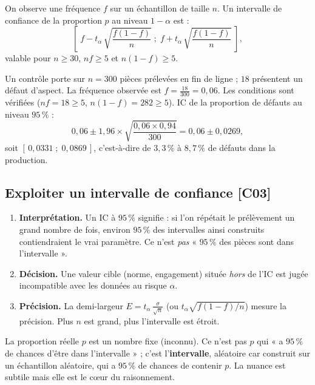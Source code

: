 \documentclass[a4paper,11pt]{article}
\begin{document}
\begin{theoreme}
On observe une fréquence $f$ sur un échantillon de taille $n$. Un intervalle de confiance de la proportion $p$ au niveau $1-\alpha$ est :
\[
\boxed{\left[\;f - t_\alpha\,\sqrt{\frac{f(1-f)}{n}}\;;\;f + t_\alpha\,\sqrt{\frac{f(1-f)}{n}}\;\right],}
\]
valable pour $n \geq 30$, $nf \geq 5$ et $n(1-f) \geq 5$.
\end{theoreme}

\begin{exemple}
Un contrôle porte sur $n = 300$ pièces prélevées en fin de ligne ; $18$ présentent un défaut d'aspect. La fréquence observée est $f = \frac{18}{300} = 0{,}06$. Les conditions sont vérifiées ($nf = 18 \geq 5$, $n(1-f) = 282 \geq 5$). IC de la proportion de défauts au niveau $95\,\%$ :
\[
0{,}06 \pm 1{,}96 \times \sqrt{\frac{0{,}06 \times 0{,}94}{300}} = 0{,}06 \pm 0{,}0269,
\]
soit $[\,0{,}0331\;;\;0{,}0869\,]$, c'est-à-dire de $3{,}3\,\%$ à $8{,}7\,\%$ de défauts dans la production.
\end{exemple}

\subsection{Exploiter un intervalle de confiance \hfill {\normalsize\color{uimmred}[C03]}}

\begin{methode}
\begin{enumerate}
  \item \textbf{Interprétation.} Un IC à $95\,\%$ signifie : si l'on répétait le prélèvement un grand nombre de fois, environ $95\,\%$ des intervalles ainsi construits contiendraient le vrai paramètre. Ce n'est \emph{pas} « $95\,\%$ des pièces sont dans l'intervalle ».
  \item \textbf{Décision.} Une valeur cible (norme, engagement) située \emph{hors} de l'IC est jugée incompatible avec les données au risque $\alpha$.
  \item \textbf{Précision.} La demi-largeur $E = t_\alpha\,\frac{\sigma}{\sqrt{n}}$ (ou $t_\alpha\sqrt{f(1-f)/n}$) mesure la précision. Plus $n$ est grand, plus l'intervalle est étroit.
\end{enumerate}
\end{methode}

\begin{attention}
La proportion réelle $p$ est un nombre fixe (inconnu). Ce n'est pas $p$ qui « a $95\,\%$ de chances d'être dans l'intervalle » ; c'est l'\textbf{intervalle}, aléatoire car construit sur un échantillon aléatoire, qui a $95\,\%$ de chances de contenir $p$. La nuance est subtile mais elle est le cœur du raisonnement.
\end{attention}
\end{document}
